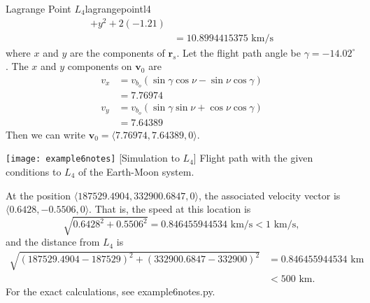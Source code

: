 \begin{examples}{Lagrange Point \(L_4\)}{lagrangepointl4}
\begin{align*}
{{{            + y^2}} + 2(-1.21)}\\
          & = 10.8994415375\text{ km}/\text{s}
  \end{align*}
  where \(x\) and \(y\) are the components of \(\mathbf{r}_s\).
  Let the flight path angle be \(\gamma = -14.02^{\circ}\).
  The \(x\) and \(y\) components on \(\mathbf{v}_{0}\) are
  \begin{align*}
    v_x & = v_{b_o}(\sin\gamma\cos\nu - \sin\nu\cos\gamma)\\
        & = 7.76974\\
    v_y & = v_{b_o}(\sin\gamma\sin\nu + \cos\nu\cos\gamma)\\
        & = 7.64389
  \end{align*}
  Then we can write \(\mathbf{v}_0 = \langle 7.76974,7.64389,0\rangle\).
  \par\smallskip
  \begin{minipage}{\linewidth}
    \centering
    \texttt{[image: example6notes]}
    [Simulation to \(L_4\)]
    {Flight path with the given conditions to \(L_4\) of the Earth-Moon
      system.}
    \label{launchtol4earthmoon}
  \end{minipage}
  \par\smallskip
  At the position \(\langle 187529.4904, 332900.6847, 0\rangle\), the
  associated   velocity vector is \(\langle 0.6428, -0.5506, 0\rangle\).
  That is, the speed at this location is
  \[
  \sqrt{0.6428^2 + 0.5506^2} = 0.846455944534\text{ km}/\text{s} <
  1\text{ km}/\text{s},
  \]
  and the distance from \(L_4\) is
  \begin{align*}
    \sqrt{(187529.4904 - 187529)^2 + (332900.6847 - 332900)^2}
    & = 0.846455944534\text{ km}\\
    & < 500\text{ km}.
  \end{align*}
  For the exact calculations, see example6notes.py.
\end{examples}
